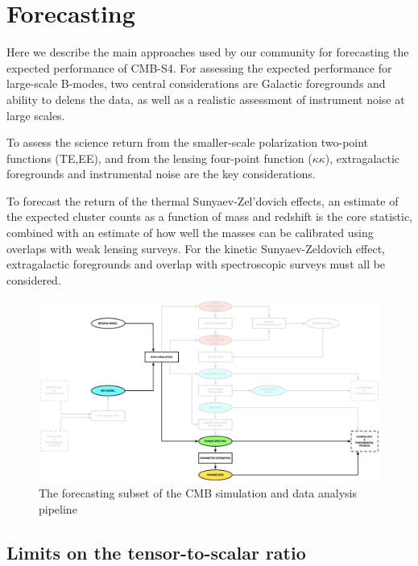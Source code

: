 
\section{Forecasting}

Here we describe the main approaches used by our community for forecasting the expected performance of CMB-S4. For assessing the expected performance for large-scale B-modes, two central considerations are Galactic foregrounds and ability to delens the data, as well as a realistic assessment of instrument noise at large scales. 

To assess the science return from the smaller-scale polarization two-point functions (TE,EE), and from the lensing four-point function ($\kappa \kappa$), extragalactic foregrounds and instrumental noise are the key considerations.

To forecast the return of the thermal Sunyaev-Zel'dovich effects, an estimate of the expected cluster counts as a function of mass and redshift is the core statistic, combined with an estimate of how well the masses can be calibrated using overlaps with weak lensing surveys. For the kinetic Sunyaev-Zeldovich effect, extragalactic foregrounds and overlap with spectroscopic surveys must all be considered. 

\begin{figure}[htbp]
\centering
\includegraphics[width=1\textwidth]{Analysis/fc}
\caption{The forecasting subset of the CMB simulation and data analysis pipeline}
\label{default}
\end{figure}


\subsection{Limits on the tensor-to-scalar ratio}

